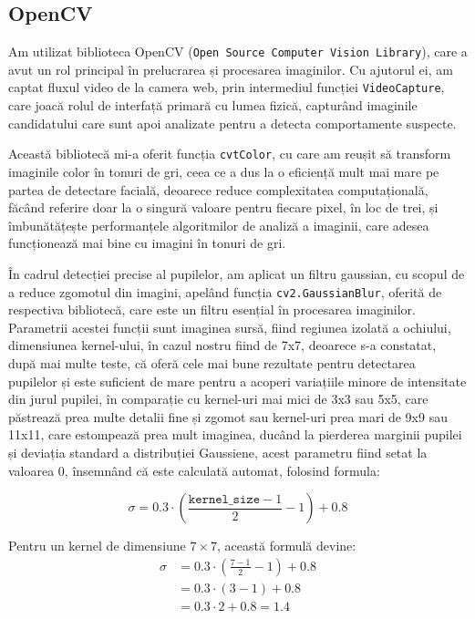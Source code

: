 \documentclass[12pt,a4paper]{article}
\begin{document}
\subsection{OpenCV}
Am utilizat biblioteca OpenCV (\texttt{Open Source Computer Vision Library}),
care a avut un rol principal în prelucrarea și procesarea imaginilor\cite{hasan2021face}. Cu
ajutorul ei, am captat fluxul video de la camera web, prin intermediul
funcției \texttt{VideoCapture}, care joacă rolul de interfață primară cu lumea
fizică, capturând imaginile candidatului care sunt apoi analizate pentru
a detecta comportamente suspecte.

Această bibliotecă mi-a oferit funcția \texttt{cvtColor}, cu care am reușit să
transform imaginile color în tonuri de gri, ceea ce a dus la o eficiență
mult mai mare pe partea de detectare facială, deoarece reduce
complexitatea computațională, făcând referire doar la o singură valoare
pentru fiecare pixel, în loc de trei, și îmbunătățește performanțele
algoritmilor de analiză a imaginii, care adesea funcționează mai bine cu
imagini în tonuri de gri.

În cadrul detecției precise al pupilelor, am aplicat un filtru gaussian,
cu scopul de a reduce zgomotul din imagini, apelând funcția
\texttt{cv2.GaussianBlur}, oferită de respectiva bibliotecă, care este un filtru
esențial în procesarea imaginilor. Parametrii acestei funcții sunt
imaginea sursă, fiind regiunea izolată a ochiului, dimensiunea
kernel-ului, în cazul nostru fiind de 7x7, deoarece s-a constatat, după
mai multe teste, că oferă cele mai bune rezultate pentru detectarea
pupilelor și este suficient de mare pentru a acoperi variațiile minore
de intensitate din jurul pupilei, în comparație cu kernel-uri mai mici
de 3x3 sau 5x5, care păstrează prea multe detalii fine și zgomot sau
kernel-uri prea mari de 9x9 sau 11x11, care estompează prea mult
imaginea, ducând la pierderea marginii pupilei și deviația standard a
distribuției Gaussiene, acest parametru fiind setat la valoarea 0,
însemnând că este calculată automat, folosind formula:

\begin{equation}
\sigma = 0.3 \cdot \left( \frac{\texttt{kernel\_size} - 1}{2} - 1 \right) + 0.8
\end{equation}

Pentru un kernel de dimensiune \(7 \times 7\), această formulă devine:
\begin{align}
\sigma &= 0.3 \cdot \left( \frac{7 - 1}{2} - 1 \right) + 0.8 \nonumber \\
    &= 0.3 \cdot (3 - 1) + 0.8 \nonumber \\
    &= 0.3 \cdot 2 + 0.8 \nonumber = 1.4
\end{align}
\end{document}
